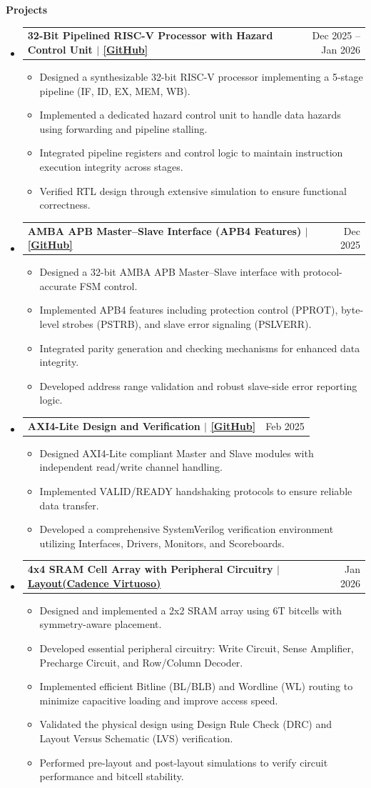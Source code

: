 \documentclass[letterpaper,11pt]{article}
\makeatletter
\newcommand{\resumeItem}[1]{\item\small{#1}}
\newcommand{\resumeProjectHeading}[2]{
\item
\begin{tabular*}{0.97\textwidth}{l@{\extracolsep{\fill}}r}
\small\textbf{#1} & \small #2 \\
\end{tabular*}
}
\newcommand{\resheading}[1]{%
\vspace{6pt}
\noindent
\colorbox{mygrey}{%
  \parbox{\dimexpr\linewidth-2\fboxsep}{%
    \textbf{#1}
  }%
}
\par\vspace{4pt}
}
\makeatother
\begin{document}
\resheading{Projects}
\begin{itemize}

\resumeProjectHeading
{32-Bit Pipelined RISC-V Processor with Hazard Control Unit $|$ \href{https://github.com/AnshKhanpara/RISC-V-PIPELINE}{[GitHub]}}
{Dec 2025 -- Jan 2026}
\begin{itemize}
\resumeItem{Designed a synthesizable 32-bit RISC-V processor implementing a 5-stage pipeline (IF, ID, EX, MEM, WB).}
\resumeItem{Implemented a dedicated hazard control unit to handle data hazards using forwarding and pipeline stalling.}
\resumeItem{Integrated pipeline registers and control logic to maintain instruction execution integrity across stages.}
\resumeItem{Verified RTL design through extensive simulation to ensure functional correctness.}
\end{itemize}

\resumeProjectHeading
{AMBA APB Master–Slave Interface (APB4 Features) $|$ \href{https://github.com/AnshKhanpara/AMBA-APB}{[GitHub]}}
{Dec 2025}
\begin{itemize}
\resumeItem{Designed a 32-bit AMBA APB Master–Slave interface with protocol-accurate FSM control.}
\resumeItem{Implemented APB4 features including protection control (PPROT), byte-level strobes (PSTRB), and slave error signaling (PSLVERR).}
\resumeItem{Integrated parity generation and checking mechanisms for enhanced data integrity.}
\resumeItem{Developed address range validation and robust slave-side error reporting logic.}
\end{itemize}

\resumeProjectHeading
{AXI4-Lite Design and Verification $|$ \href{https://github.com/AnshKhanpara/AMBA-AXI4-LITE}{[GitHub]}}
{Feb 2025}
\begin{itemize}
\resumeItem{Designed AXI4-Lite compliant Master and Slave modules with independent read/write channel handling.}
\resumeItem{Implemented VALID/READY handshaking protocols to ensure reliable data transfer.}
\resumeItem{Developed a comprehensive SystemVerilog verification environment utilizing Interfaces, Drivers, Monitors, and Scoreboards.}
\end{itemize}

\resumeProjectHeading
{4x4 SRAM Cell Array with Peripheral Circuitry $|$ \href{https://github.com/AnshKhanpara/SRAM-6T-Layout}{Layout(Cadence Virtuoso)}}
{Jan 2026}
\begin{itemize}
\resumeItem{Designed and implemented a 2x2 SRAM array using 6T bitcells with symmetry-aware placement.}
\resumeItem{Developed essential peripheral circuitry: Write Circuit, Sense Amplifier, Precharge Circuit, and Row/Column Decoder.}
\resumeItem{Implemented efficient Bitline (BL/BLB) and Wordline (WL) routing to minimize capacitive loading and improve access speed.}
\resumeItem{Validated the physical design using Design Rule Check (DRC) and Layout Versus Schematic (LVS) verification.}
\resumeItem{Performed pre-layout and post-layout simulations to verify circuit performance and bitcell stability.}
\end{itemize}


\end{itemize}
\end{document}
